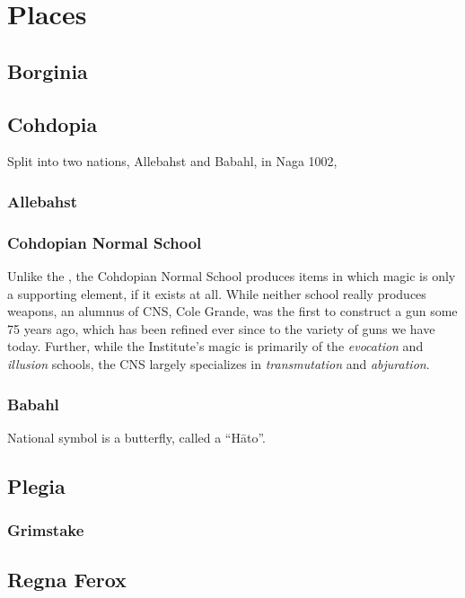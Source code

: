 \section{Places}

\subsection{Borginia}
\label{nations:borginia}

\subsection{Cohdopia}
\label{nations:cohdopia}
Split into two nations, Allebahst and Babahl, in Naga 1002, 

\subsubsection{Allebahst}
\label{nations:allebahst}
\subsubsection{Cohdopian Normal School}
\label{places:cns}
Unlike the , the Cohdopian Normal School produces items in which magic is only a supporting element, if it exists at all. While neither school really produces weapons, an alumnus of CNS, Cole Grande, was the first to construct a gun some 75 years ago, which has been refined ever since to the variety of guns we have today. Further, while the Institute's magic is primarily of the \textit{evocation} and \textit{illusion} schools, the CNS largely specializes in \textit{transmutation} and \textit{abjuration}.
\subsubsection{Babahl}
\label{nations:babahl}
National symbol is a butterfly, called a ``H\=ato''.

\subsection{Plegia}
\label{nations:plegia}

\subsubsection{Grimstake}
\label{places:grimstake}

\subsection{Regna Ferox}
\label{nations:ferox}

